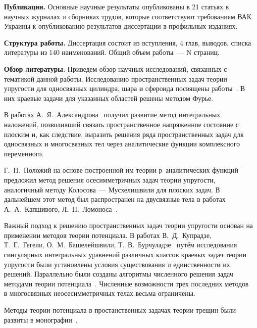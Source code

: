 {\bf Публикации.} Основные научные результаты опубликованы в 21 статьях в научных журналах и сборниках трудов, которые соответствуют требованиям ВАК Украины к опубликованию результатов диссертации в профильных изданиях. 

{\bf Структура работы.} Диссертация состоит из вступления, 4 глав, выводов, списка литературы из 140 наименований. Общий объем работы~--- N страниц.

{\bf Обзор литературы.} Приведем обзор научных исследований, связанных с тематикой данной работы. Исследованию пространственных задач теории упругости для односвязных цилиндра, шара и сфероида посвящены работы~\cite{Abramian, Andreev, Valov, Volpert1977, Volpert1967, Gomilko, Grinchenko1965, Grinchenko1967, Grinchenko1985, Grinchenko1978, Lur'e, Podilchuk1967, Podilchuk1984, Prokopov, Tokovyy, Ulitko, Chen1978-1, Chen1978-2, Edwards, Zhong, Zureick1989, Zureick1988, Ambartsumian, Arutynian, Kaufman, Kolesov, Meleshko}. В них краевые задачи для указанных областей решены методом Фурье.

В работах А.~Я.~Александрова~\cite{Aleksandrov1978, Aleksandrov1973} получил развитие метод интегральных наложений, позволивший связать пространственное напряженное состояние с плоским и, как следствие, выразить решения ряда пространственных задач для односвязных и многосвязных тел через аналитические функции комплексного переменного.

Г.~Н.~Положий на основе построенной им теории р–аналитических функций предложил метод решения осесимметричных задач теории упругости, аналогичный методу Колосова~--- Мусхелишвили для плоских задач. В дальнейшем этот метод был распространен на двусвязные тела в работах А.~А.~Капшивого, Л.~Н.~Ломоноса~\cite{Kapshiviy, Lomonos}.

Важный подход к решению пространственных задач теории упругости основан на применении методов теории потенциала. В работах В.~Д.~Купрадзе, Т.~Г.~Гегели, О.~М.~Башелейшвили, Т.~В.~Бурчуладзе~\cite{Kupradze, Burchuladze} путём исследования сингулярных интегральных уравнений различных классов краевых задач теории упругости были установлены условия существования и единственности их решений. Параллельно были созданы алгоритмы численного решения задач методами теории потенциала~\cite{Aleksandrov1973}. Численные возможности трех последних методов в многосвязных неосесимметричных телах весьма ограничены.
 
Методы теории потенциала в простанственных задачах теории трещин были развиты в монографии~\cite{Kit}.
  
